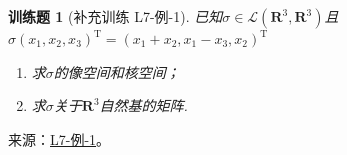\documentclass[12pt,fontset=fandol]{ctexart}
\newtheorem{exercise}{训练题}[section]
\begin{document}
\begin{exercise}[补充训练 L7-例-1]\label{prob:L7-例-1}
已知$\sigma \in \mathcal{L}(\mathbf{R}^3,\mathbf{R}^3)$且$\sigma(x_1,x_2,x_3)^{\mathrm{T}}=(x_1+x_2,x_1-x_3, x_2)^{\mathrm{T}}$
    \begin{enumerate}
        \item 求$\sigma$的像空间和核空间；

        \item 求$\sigma$关于$\mathbf{R}^3$自然基的矩阵.
    \end{enumerate}
\end{exercise}
\noindent 来源：\href{https://github.com/yhwu-is/Linear-Algebra-Left-Undone/blob/new/%E8%AE%B2%E4%B9%89/%E4%B8%93%E9%A2%98/7%20%E7%BA%BF%E6%80%A7%E6%98%A0%E5%B0%84%E7%9F%A9%E9%98%B5%E8%A1%A8%E7%A4%BA%E4%B8%8E%E7%9F%A9%E9%98%B5%E8%BF%90%E7%AE%97%E5%9F%BA%E7%A1%80.tex}{L7-例-1}。
\end{document}
